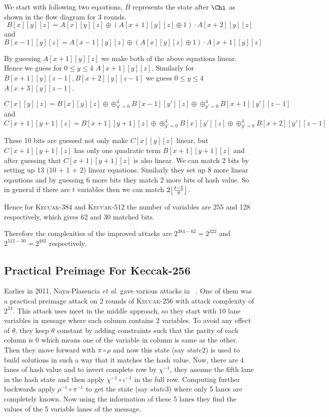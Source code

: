 \documentclass[runningheads]{llncs}
\DeclarePairedDelimiter\floor{\lfloor}{\rfloor}
\newcommand{\KECCAK}{\mbox{\textsc{Keccak}}}
\newcommand{\etal}{\textit{et al. }}
\begin{document}
		We start with following two eqautions, $B$ represents the state after $\Chi$ as shown in the flow diagram for 3 rounds.
		\[
			B[x][y][z] = A[x][y][z] \oplus (A[x+1][y][z] \oplus 1) \cdot A[x+2][y][z]
		\] and
		\[
			B[x-1][y][z] = A[x-1][y][z] \oplus (A[x][y][z] \oplus 1) \cdot A[x+1][y][z]
		\]

		By gueesing $A[x+1][y][z]$ we make both of the above equations linear. Hence we guess for $0 \leq y \leq 4$ $A[x+1][y][z]$. Similarly for $B[x+1][y][z-1], B[x+2][y][z-1]$ we guess $0 \leq y \leq 4$ $A[x+3][y][z-1]$. 
		
		\[
        C[x][y][z] = B[x][y][z] \oplus \oplus_{y' = 0}^{4} B[x-1][y'][z] \oplus \oplus_{y' = 0}^{4} B[x+1][y'][z-1]
    \] and 
		\[
        C[x+1][y+1][z] = B[x+1][y+1][z] \oplus \oplus_{y' = 0}^{4} B[x][y'][z] \oplus \oplus_{y' = 0}^{4} B[x+2][y'][z-1]
    \]

		These 10 bits are guessed not only make $C[x][y][z]$ linear, but $C[x+1][y+1][z]$ has only one quadratic term $B[x+1][y+1][z]$ and after guessing that $C[x+1][y+1][z]$ is also linear. We can match 2 bits by setting up 13 (10 + 1 + 2) linear equations. Similarly they set up 8 more linear eqautions and by guessing 6 more bits they match 2 more bits of hash value. So in general if there are $t$ variables then we can match $ 2\floor*{\frac{t-5}{8}}$.

		Hence for \KECCAK-$384$ and \KECCAK-$512$ the number of variables are 255 and 128 respectively, which gives 62 and 30 matched bits.
		
		Therefore the complexities of the improved attacks are $2^{384 - 62} = 2^{322}$ and $2^{512 - 30} = 2^{482}$ respectively.

\subsection{Practical Preimage For Keccak-256}

Earlier in 2011, Naya-Plasencia \etal gave various attacks in ~\cite{naya2011practical}. One of them was a practical preimage attack on 2 rounds of \KECCAK-$256$ with attack complexity of $2^{33}$. This attack uses meet in the middle approach, so they start with $10$ lane variables in message where each column contains $2$ variables. To avoid any effect of $\theta$, they keep $\theta$ constant by adding constraints such that the parity of each column is $0$ which means one of the variable in column is same as the other. Then they move forward with $\pi \circ \rho$ and now this state (say $state2$) is used to build solutions in such a way that it matches the hash value. Now, there are $4$ lanes of hash value and to invert complete row by $\chi^{-1}$, they assume the fifth lane in the hash state and then apply $\chi^{-1} \circ \iota^{-1}$ in the full row. Computing further backwards apply $\rho^{-1} \circ \pi^{-1}$ to get the state (say $state3$) where only 5 lanes are completely known. Now using the information of these 5 lanes they find the values of the 5 variable lanes of the message.
\end{document}
